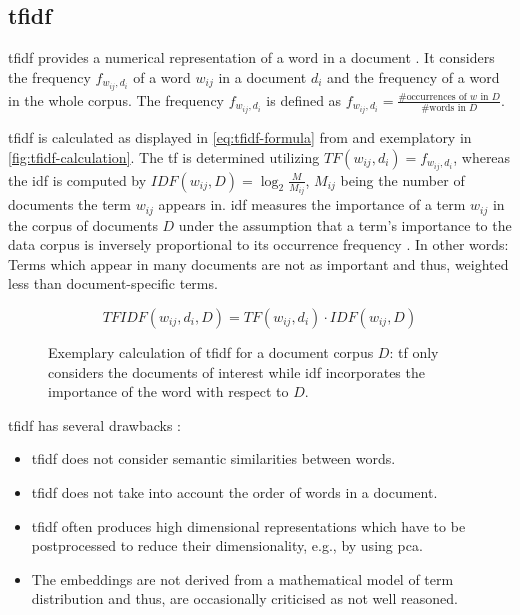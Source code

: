 \subsection{\ac{tfidf}}\label{subsec:tfidf}

\ac{tfidf} provides a numerical representation of a word in a document \cite{clusteringDocs2020}.
It considers the frequency $f_{w_{ij}, d_i}$  of a word $w_{ij}$ in a document $d_i$ and the frequency of a word in the whole corpus. 
The frequency $f_{w_{ij}, d_i}$ is defined as $f_{w_{ij}, d_i} = \frac{\# \text{occurrences of } w \text{ in }D}{\# \text{words in }D}$.

\ac{tfidf} is calculated as displayed in \autoref{eq:tfidf-formula} from \cite{clusteringDocs2020} and exemplatory in \autoref{fig:tfidf-calculation}.
The \ac{tf} is determined utilizing $TF(w_{ij}, d_i) = f_{w_{ij}, d_i}$, whereas the \ac{idf} is computed by $IDF(w_{ij}, D) = \log_2\frac{M}{M_{ij}}$, 
$M_{ij}$ being the number of documents the term $w_{ij}$ appears in.
\ac{idf} measures the importance of a term $w_{ij}$ in the corpus of documents $D$
under the assumption that a term's importance to the data corpus is inversely proportional to its occurrence frequency \cite{tfidf2008}.
In other words: Terms which appear in many documents are not as important and thus, weighted less than document-specific terms. 

\begin{equation}
    TFIDF(w_{ij}, d_i, D) = TF(w_{ij}, d_i) \cdot IDF(w_{ij}, D)
    \label{eq:tfidf-formula}
\end{equation}


\begin{figure}[htp] %
    \centering
    
    \caption[Exemplary calculation of \ac{tfidf} values]{
        Exemplary calculation of \ac{tfidf} for a document corpus $D$: 
        \ac{tf} only considers the documents of interest while 
        \ac{idf} incorporates the importance of the word with respect to $D$.
    }
    \label{fig:tfidf-calculation}
\end{figure}

\ac{tfidf} has several drawbacks \cite{clusteringDocs2020,tfidf2008}:
\begin{itemize}
    \item \ac{tfidf} does not consider semantic similarities between words.
    \item \ac{tfidf} does not take into account the order of words in a document.
    \item \ac{tfidf} often produces high dimensional representations which have to be postprocessed to reduce their dimensionality, e.g., by using \ac{pca}.
    \item The embeddings are not derived from a mathematical model of term distribution and thus, are occasionally criticised as not well reasoned.
\end{itemize}